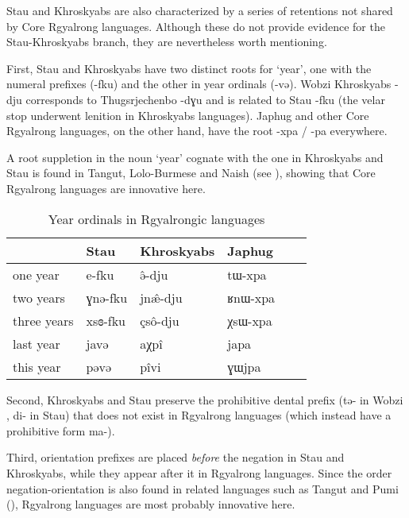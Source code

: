 \documentclass[oneside,a4paper,11pt]{article}
\newcommand{\ipa}[1]{{\phon#1}} %
\begin{document}
Stau and Khroskyabs are also characterized by a series of retentions not shared by Core Rgyalrong languages. Although these do not provide evidence for the Stau-Khroskyabs branch, they are nevertheless worth mentioning.

First, Stau and Khroskyabs have two distinct roots for `year', one with the numeral prefixes (\ipa{-fku}) and the other in year ordinals (\ipa{-və}). Wobzi Khroskyabs \ipa{-dju} corresponds to Thugsrjechenbo \ipa{-dɣu} and is related to Stau \ipa{-fku} (the velar stop underwent lenition in Khroskyabs languages). Japhug and other Core Rgyalrong languages, on the other hand, have the root \ipa{-xpa} / \ipa{-pa} everywhere. 

A root suppletion in the noun `year' cognate with the one in Khroskyabs and Stau is found in Tangut, Lolo-Burmese and Naish (see \citealt{jacques.michaud11naish}), showing that Core Rgyalrong languages are innovative here.

  \begin{table}[H]
  \caption{Year ordinals in Rgyalrongic languages} \label{tab:year} \centering
 \begin{tabular}{llllll}
 \toprule
 & 	Stau & 	Khroskyabs & 	Japhug & 	\\	
 \midrule
one year & 	\ipa{e-fku} & 	\ipa{ə̂-dju } & 	\ipa{tɯ-xpa} & 	\\	
two years & 	\ipa{ɣnə-fku} & 	\ipa{jnæ̂-dju } & 	\ipa{ʁnɯ-xpa} & 	\\	
three years & 	\ipa{xsɞ-fku} & 	\ipa{çsô-dju } & 	\ipa{χsɯ-xpa} & 	\\	
 \midrule
last year & 	\ipa{javə} & 	\ipa{aχpî} & 	\ipa{japa} & 	\\	
this year & 	\ipa{pəvə} & 	\ipa{pîvi} & 	\ipa{ɣɯjpa} & 	\\	
\bottomrule
\end{tabular}
\end{table}


Second, Khroskyabs and Stau preserve the prohibitive dental prefix (\ipa{tə-} in Wobzi \citealt[130-1]{lai13affixale}, \ipa{di-} in Stau) that does not exist in Rgyalrong languages (which instead have a prohibitive form \ipa{ma-}).

Third, orientation prefixes are placed \textit{before} the negation in Stau and Khroskyabs, while they appear after it in Rgyalrong languages. Since the order negation-orientation is also found in related languages such as Tangut and Pumi (\citealt{jacques11tangut.verb}), Rgyalrong languages are most probably innovative here.
\end{document}
